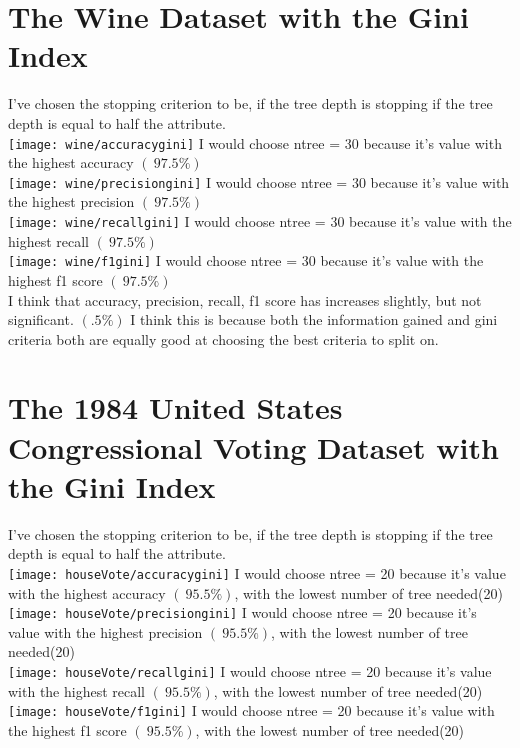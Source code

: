\documentclass[letter]{amsart}
\begin{document}
\newpage
\section{The Wine Dataset with the Gini Index}

I've chosen the stopping criterion to be, if the tree depth is stopping if the tree depth is equal to half the attribute.\\
\texttt{[image: wine/accuracygini]}
I would choose ntree = 30 because it's value with the highest accuracy $(~97.5\%)$\\
\texttt{[image: wine/precisiongini]}
I would choose ntree = 30 because it's value with the highest precision $(~97.5\%)$\\
\texttt{[image: wine/recallgini]}
I would choose ntree = 30 because it's value with the highest recall $(~97.5\%)$\\
\texttt{[image: wine/f1gini]}
I would choose ntree = 30 because it's value with the highest f1 score $(~97.5\%)$\\

I think that accuracy, precision, recall, f1 score has increases slightly, but not significant. $(.5\%)$
I think this is because both the information gained and gini criteria both are equally good at choosing the best criteria to split on.\\

\newpage
\section{The 1984 United States Congressional Voting Dataset with the Gini Index}
I've chosen the stopping criterion to be, if the tree depth is stopping if the tree depth is equal to half the attribute.\\
\texttt{[image: houseVote/accuracygini]}
I would choose ntree = 20 because it's value with the highest accuracy $(~95.5\%)$, with the lowest number of tree needed(20)\\
\texttt{[image: houseVote/precisiongini]}
I would choose ntree = 20 because it's value with the highest precision $(~95.5\%)$, with the lowest number of tree needed(20)\\
\texttt{[image: houseVote/recallgini]}
I would choose ntree = 20 because it's value with the highest recall $(~95.5\%)$, with the lowest number of tree needed(20)\\
\texttt{[image: houseVote/f1gini]}
I would choose ntree = 20 because it's value with the highest f1 score $(~95.5\%)$, with the lowest number of tree needed(20)\\
\end{document}
